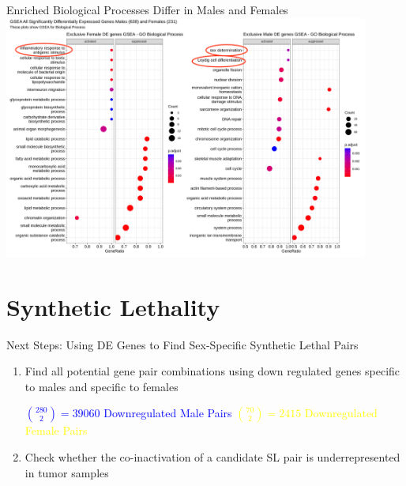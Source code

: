 \documentclass{beamer}
\begin{document}
	\begin{frame}{Enriched Biological Processes Differ in Males and Females}
		\includegraphics[width=12cm, height=8cm]{all_cancersgsea_exclusivedegenes_male_female_bp0.9.png}
	\end{frame}

	\section{Synthetic Lethality}
	\begin{frame}{Next Steps: Using DE Genes to Find Sex-Specific Synthetic Lethal Pairs}
		\begin{enumerate}
			\item Find all potential gene pair combinations using down regulated genes specific to males and specific to females \newline
			
			\textcolor{blue}{${280 \choose 2 } = 39060$ Downregulated Male Pairs \newline}
			\textcolor{yellow}{${70 \choose 2 } = 2415$ Downregulated Female Pairs}
			
			\item Check whether the co-inactivation of a candidate SL pair is underrepresented in tumor samples
		\end{enumerate}
	\end{frame}
\end{document}
